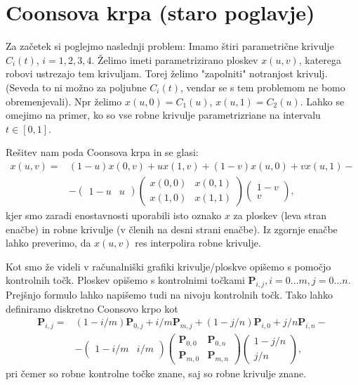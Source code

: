 \documentclass{article}
\begin{document}
\section{Coonsova krpa (staro poglavje)}

Za začetek si poglejmo naslednji problem:
Imamo štiri parametrične krivulje $C_i(t)$, $i=1,2,3,4$. 
Želimo imeti parametrizirano ploskev $x(u,v)$, katerega robovi ustrezajo tem krivuljam. Torej želimo "zapolniti" notranjost krivulj. (Seveda to ni možno za poljubne $C_i (t)$, vendar se s tem problemom ne bomo obremenjevali). 
Npr želimo $x(u,0) = C_1(u)$, $x(u,1) = C_2(u)$. Lahko se omejimo na primer, ko so vse robne krivulje parametrizriane na intervalu $t \in [0,1]$.

Rešitev nam poda Coonsova krpa in se glasi:
\begin{align}
x(u,v) =& (1-u) x(0,v) + u x(1,v) + (1-v) x(u,0) + v x(u,1) - \nonumber \\&- 
\begin{pmatrix} 1-u & u \end{pmatrix} \begin{pmatrix} x(0,0) & x(0,1) \\ x(1,0) & x(1,1) \end{pmatrix}
\begin{pmatrix} 1-v \\ v \end{pmatrix},
\end{align}
kjer smo zaradi enostavnosti uporabili isto oznako $x$ za ploskev (leva stran enačbe) in robne krivulje (v členih na desni strani enačbe). Iz zgornje enačbe lahko preverimo, da $x(u,v)$ res interpolira robne krivulje.

Kot smo že videli v računalniški grafiki krivulje/ploskve opišemo s pomočjo kontrolnih točk. Ploskev opišemo s kontrolnimi točkami $\textbf{P}_{i,j}, i= 0 \dots m, j= 0 \dots n$.
Prejšnjo formulo lahko napišemo tudi na nivoju kontrolnih točk. Tako lahko definiramo diskretno Coonsovo krpo kot
\begin{align}
\textbf{P}_{i,j} =& (1-i/m) \textbf{P}_{0,j} + i/m \textbf{P}_{m,j} + (1-j/n) \textbf{P}_{i,0} + j/n \textbf{P}_{i,n} - \nonumber \\ &-
\begin{pmatrix} 1-i/m & i/m \end{pmatrix} \begin{pmatrix} \textbf{P}_{0,0} & \textbf{P}_{0,n} \\ \textbf{P}_{m,0} & \textbf{P}_{m,n} \end{pmatrix}
\begin{pmatrix} 1-j/n \\ j/n \end{pmatrix},
\end{align}
pri čemer so robne kontrolne točke znane, saj so robne krivulje znane.
\end{document}
